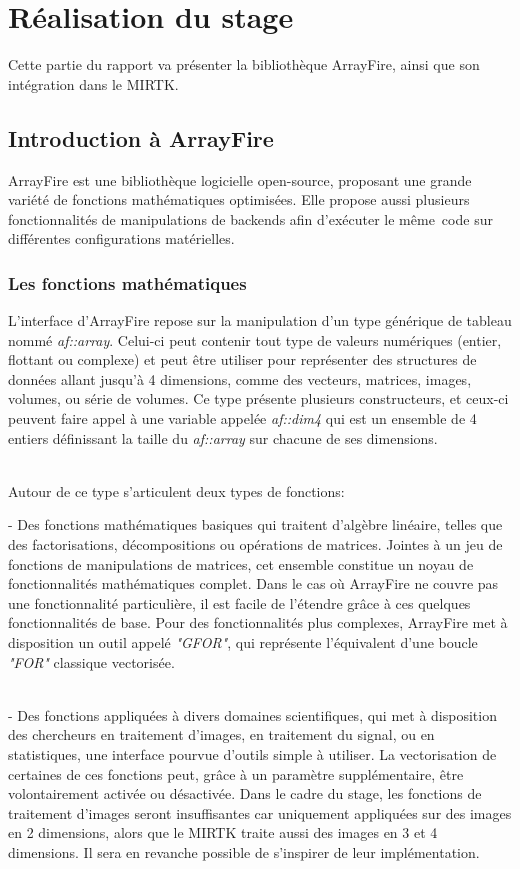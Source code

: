 \documentclass[10pt]{report}
\begin{document}
\chapter{Réalisation du stage} \vspace{-0.5cm}
Cette partie du rapport va présenter la bibliothèque ArrayFire, ainsi que son intégration dans le MIRTK.
	\section{Introduction à ArrayFire}
	ArrayFire est une bibliothèque logicielle open-source, proposant une grande variété de fonctions mathématiques optimisées. Elle propose aussi plusieurs fonctionnalités de manipulations de backends afin d'exécuter le même code sur différentes configurations matérielles.
	\subsection{Les fonctions mathématiques}
	L'interface d'ArrayFire repose sur la manipulation d'un type générique de tableau nommé \textit{af::array}. Celui-ci peut contenir tout type de valeurs numériques (entier, flottant ou complexe) et peut être utiliser pour représenter des structures de données allant jusqu'à 4 dimensions, comme des vecteurs, matrices, images, volumes, ou série de volumes. Ce type présente plusieurs constructeurs, et ceux-ci peuvent faire appel à une variable appelée \textit{af::dim4} qui est un ensemble de 4 entiers définissant la taille du \textit{af::array} sur chacune de ses dimensions.\\ ~\par 
	
	\noindent Autour de ce type s'articulent deux types de fonctions: ~\par 
	- Des fonctions mathématiques basiques qui traitent d'algèbre linéaire, telles que des factorisations, décompositions ou opérations de matrices. Jointes à un jeu de fonctions de manipulations de matrices, cet ensemble constitue un noyau de fonctionnalités mathématiques complet. Dans le cas où ArrayFire ne couvre pas une fonctionnalité particulière, il est facile de l'étendre grâce à ces quelques fonctionnalités de base. Pour des fonctionnalités plus complexes, ArrayFire met à disposition un outil appelé \textit{"GFOR"}, qui représente l'équivalent d'une boucle \textit{"FOR"} classique vectorisée. \\~\par 
	- Des fonctions appliquées à divers domaines scientifiques, qui met à disposition des chercheurs en traitement d'images, en traitement du signal, ou en statistiques, une interface pourvue d'outils simple à utiliser. La vectorisation de certaines de ces fonctions peut, grâce à un paramètre supplémentaire, être volontairement activée ou désactivée. Dans le cadre du stage, les fonctions de traitement d'images seront insuffisantes car uniquement appliquées sur des images en 2 dimensions, alors que le MIRTK traite aussi des images en 3 et 4 dimensions. Il sera en revanche possible de s'inspirer de leur implémentation.
\end{document}
